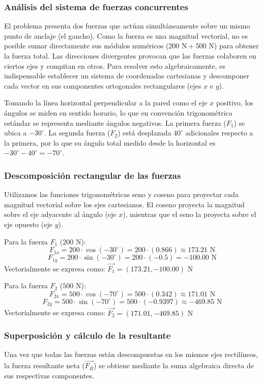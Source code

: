 \documentclass[12pt, a4paper]{article}
\begin{document}
\subsubsection*{Análisis del sistema de fuerzas concurrentes}
El problema presenta dos fuerzas que actúan simultáneamente sobre un mismo punto de anclaje (el gancho). Como la fuerza es una magnitud vectorial, no es posible sumar directamente sus módulos numéricos ($200 \text{ N} + 500 \text{ N}$) para obtener la fuerza total. Las direcciones divergentes provocan que las fuerzas colaboren en ciertos ejes y compitan en otros. Para resolver esto algebraicamente, es indispensable establecer un sistema de coordenadas cartesianas y descomponer cada vector en sus componentes ortogonales rectangulares (ejes $x$ e $y$). 

Tomando la línea horizontal perpendicular a la pared como el eje $x$ positivo, los ángulos se miden en sentido horario, lo que en convención trigonométrica estándar se representa mediante ángulos negativos. La primera fuerza ($F_1$) se ubica a $-30^\circ$. La segunda fuerza ($F_2$) está desplazada $40^\circ$ adicionales respecto a la primera, por lo que su ángulo total medido desde la horizontal es $-30^\circ - 40^\circ = -70^\circ$.

\subsubsection*{Descomposición rectangular de las fuerzas}
Utilizamos las funciones trigonométricas seno y coseno para proyectar cada magnitud vectorial sobre los ejes cartesianos. El coseno proyecta la magnitud sobre el eje adyacente al ángulo (eje $x$), mientras que el seno la proyecta sobre el eje opuesto (eje $y$).

Para la fuerza $F_1$ ($200 \text{ N}$):
$$F_{1x} = 200 \cdot \cos(-30^\circ) = 200 \cdot (0.866) \approx 173.21 \text{ N}$$
$$F_{1y} = 200 \cdot \sin(-30^\circ) = 200 \cdot (-0.5) = -100.00 \text{ N}$$
Vectorialmente se expresa como: $\vec{F_1} = (173.21, -100.00) \text{ N}$

Para la fuerza $F_2$ ($500 \text{ N}$):
$$F_{2x} = 500 \cdot \cos(-70^\circ) = 500 \cdot (0.342) \approx 171.01 \text{ N}$$
$$F_{2y} = 500 \cdot \sin(-70^\circ) = 500 \cdot (-0.9397) \approx -469.85 \text{ N}$$
Vectorialmente se expresa como: $\vec{F_2} = (171.01, -469.85) \text{ N}$

\subsubsection*{Superposición y cálculo de la resultante}
Una vez que todas las fuerzas están descompuestas en los mismos ejes rectilíneos, la fuerza resultante neta ($\vec{F_R}$) se obtiene mediante la suma algebraica directa de sus respectivas componentes. 
\end{document}
